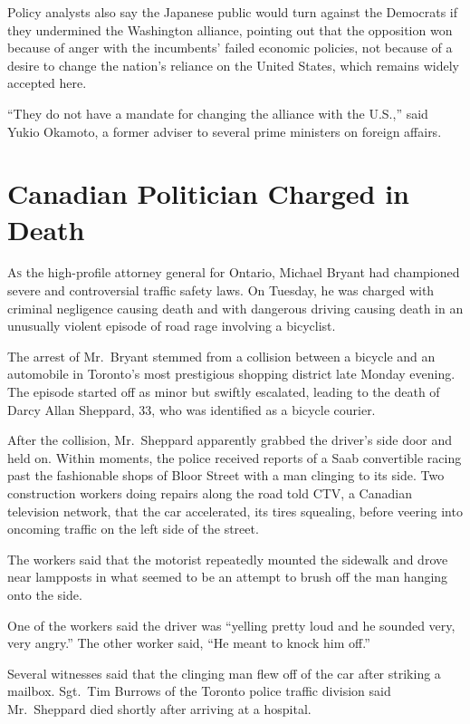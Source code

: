 ﻿\documentclass[12pt]{article}
\begin{document}
Policy analysts also say the Japanese public would turn against the Democrats if they undermined the
Washington alliance, pointing out that the opposition won because of anger with the incumbents'
failed economic policies, not because of a desire to change the nation's reliance on the United
States, which remains widely accepted here.

``They do not have a mandate for changing the alliance with the U.S.,'' said Yukio Okamoto, a former
adviser to several prime ministers on foreign affairs.

\section{Canadian Politician Charged in Death}

\lettrine{A}{s} the high-profile attorney general for Ontario, Michael Bryant had championed severe
and controversial traffic safety laws. On Tuesday, he was charged with criminal negligence causing
death and with dangerous driving causing death in an unusually violent episode of road rage
involving a bicyclist.

The arrest of Mr.~Bryant stemmed from a collision between a bicycle and an automobile in Toronto's
most prestigious shopping district late Monday evening. The episode started off as minor but swiftly
escalated, leading to the death of Darcy Allan Sheppard, 33, who was identified as a bicycle
courier.

After the collision, Mr.~Sheppard apparently grabbed the driver's side door and held on. Within
moments, the police received reports of a Saab convertible racing past the fashionable shops of
Bloor Street with a man clinging to its side. Two construction workers doing repairs along the road
told CTV, a Canadian television network, that the car accelerated, its tires squealing, before
veering into oncoming traffic on the left side of the street.

The workers said that the motorist repeatedly mounted the sidewalk and drove near lampposts in what
seemed to be an attempt to brush off the man hanging onto the side.

One of the workers said the driver was ``yelling pretty loud and he sounded very, very angry.'' The
other worker said, ``He meant to knock him off.''

Several witnesses said that the clinging man flew off of the car after striking a mailbox. Sgt.~Tim
Burrows of the Toronto police traffic division said Mr.~Sheppard died shortly after arriving at a
hospital.
\end{document}
